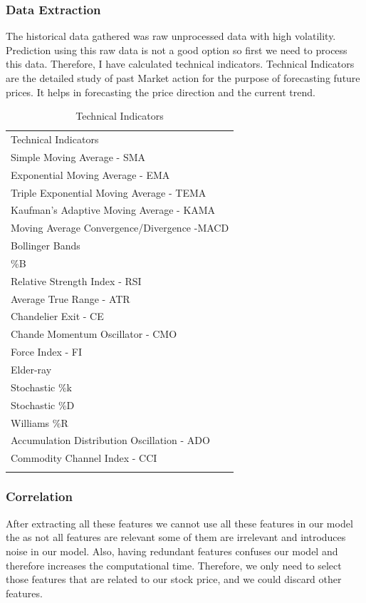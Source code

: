 \documentclass[5p,,preprint,12pt,twocolumn]{elsarticle}
\def\tblbottomrule{\noalign{\vspace*{6pt}}\hline\noalign{\vspace*{2pt}}}
\def\tblmidrule{\noalign{\vspace*{6pt}}\hline\noalign{\vspace*{2pt}}}
\begin{document}
\subsubsection{Data Extraction}The historical data gathered was raw unprocessed data with high volatility. Prediction using this raw data is not a good option so first we need to process this data. Therefore, I have calculated technical indicators. Technical Indicators are the detailed study of past Market action for the purpose of forecasting future prices. It helps in forecasting the price direction and the current trend.
\begin{table}[!htbp]
\caption{{Technical Indicators} }
\label{tw-20db9c32c5c0}
\def\arraystretch{1}
\ignorespaces 
\centering 
\begin{tabulary}{\linewidth}{L}
\hline 
Technical Indicators\\
\tblmidrule 
Simple Moving Average - SMA\\
Exponential Moving Average - EMA\\
Triple Exponential Moving Average - TEMA\\
Kaufman's Adaptive Moving Average - KAMA\\
Moving Average Convergence/Divergence -MACD\\
Bollinger Bands\\
\%B\\
Relative Strength Index - RSI \\
 Average True Range - ATR\\
Chandelier Exit - CE\\
Chande Momentum Oscillator - CMO\\
Force Index - FI\\
Elder-ray\\
Stochastic \%k\\
Stochastic \%D\\
Williams \%R\\
Accumulation Distribution Oscillation - ADO\\
Commodity Channel Index - CCI\\
\tblbottomrule 
\end{tabulary}\par 
\end{table}




\subsubsection{Correlation}After extracting all these features we cannot use all these features in our model the as not all features are relevant some of them are irrelevant and introduces noise in our model. Also, having redundant features confuses our model and therefore increases the computational time. Therefore, we only need to select those features that are related to our stock price, and we could discard other features.
\end{document}
